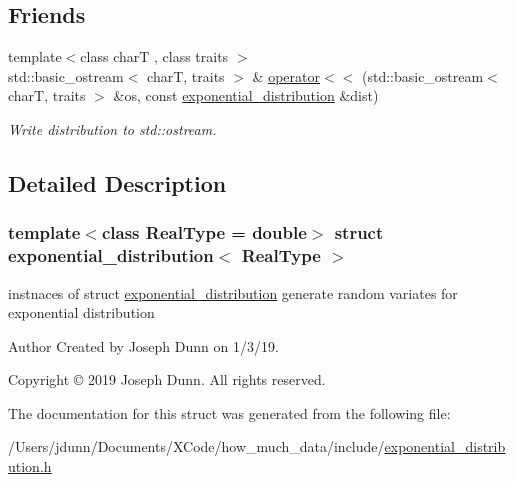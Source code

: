 \subsection*{Friends}
\begin{DoxyCompactItemize}
\item 
\mbox{\label{structexponential__distribution_a0acc132bb35454ce556d35528bdfe8f0}} 
{\footnotesize template$<$class charT , class traits $>$ }\\std\+::basic\+\_\+ostream$<$ charT, traits $>$ \& \mbox{\hyperlink{structexponential__distribution_a0acc132bb35454ce556d35528bdfe8f0}{operator$<$$<$}} (std\+::basic\+\_\+ostream$<$ charT, traits $>$ \&os, const \mbox{\hyperlink{structexponential__distribution}{exponential\+\_\+distribution}} \&dist)
\begin{DoxyCompactList}\small\item\em Write distribution to std\+::ostream. \end{DoxyCompactList}\end{DoxyCompactItemize}


\subsection{Detailed Description}
\subsubsection*{template$<$class Real\+Type = double$>$\newline
struct exponential\+\_\+distribution$<$ Real\+Type $>$}

instnaces of struct \mbox{\hyperlink{structexponential__distribution}{exponential\+\_\+distribution}} generate random variates for exponential distribution 

\begin{DoxyAuthor}{Author}
Created by Joseph Dunn on 1/3/19. 
\end{DoxyAuthor}
\begin{DoxyCopyright}{Copyright}
© 2019 Joseph Dunn. All rights reserved. 
\end{DoxyCopyright}


The documentation for this struct was generated from the following file\+:\begin{DoxyCompactItemize}
\item 
/\+Users/jdunn/\+Documents/\+X\+Code/how\+\_\+much\+\_\+data/include/\mbox{\hyperlink{exponential__distribution_8h}{exponential\+\_\+distribution.\+h}}\end{DoxyCompactItemize}
